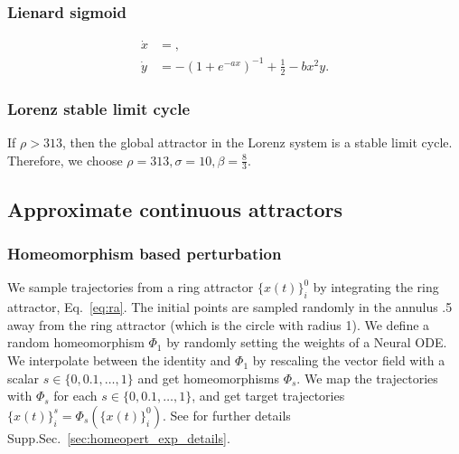 \documentclass{article}
\theoremstyle{definition} \newtheorem{definition}{Definition}  \newtheorem{example}{Example}
\theoremstyle{remark} \newtheorem{remark}{Remark}
\newcounter{ct}
\begin{document}
\subsubsection{Lienard sigmoid}
\begin{equation}
\begin{aligned}
\dot{x} &= , \\
\dot{y} &= - (1+e^{-ax})^{-1} + \tfrac{1}{2} - bx^2y.
\end{aligned}
\end{equation}


\subsubsection{Lorenz stable limit cycle} %
If $\rho>313$, then the global attractor in the Lorenz system\citep{lorenz1963deterministic} is a stable limit cycle\citep{gaiko2014global}.
Therefore, we choose $\rho=313, \sigma=10, \beta=\tfrac{8}{3}$.



\subsection{Approximate continuous attractors}



\subsubsection{Homeomorphism based perturbation}\label{sec:homeopert_exp_description}
We sample trajectories from a ring attractor $\{x(t)\}_i^0$ by integrating the ring attractor, Eq.~\ref{eq:ra}.
The initial points are sampled randomly in the annulus .5 away from the ring attractor (which is the circle with radius 1).
%
We define a random homeomorphism $\Phi_1$ by randomly setting the weights of a Neural ODE.
%
We interpolate between the identity and $\Phi_1$ by rescaling the vector field with a scalar $s \in \{0, 0.1, \dots, 1\}$ and get homeomorphisms $\Phi_s$.
%
We map the trajectories with $\Phi_s$ for each $s\in \{0, 0.1, \dots, 1\}$, and get target trajectories $\{x(t)\}_i^s = \Phi_s(\{x(t)\}_i^0)$.
%
See for further details  Supp.Sec.~\ref{sec:homeopert_exp_details}.
\end{document}
